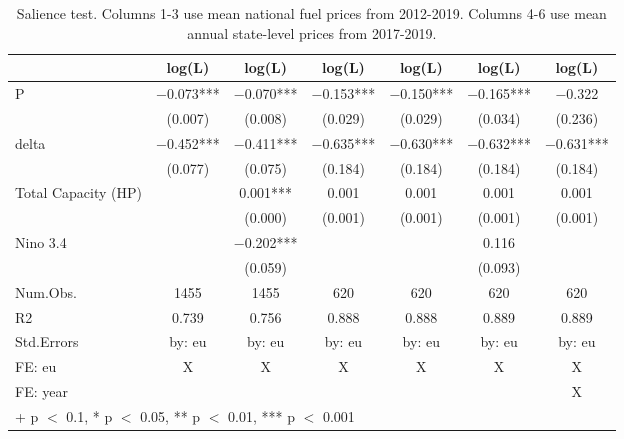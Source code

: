 \begin{table}

\caption{\label{tab:}Salience test.
             Columns 1-3 use mean national fuel prices from 2012-2019.
             Columns 4-6 use mean annual state-level prices from 2017-2019.}
\centering
\begin{tabular}[t]{lcccccc}
\toprule
  & log(L) & log(L)  & log(L)   & log(L)    & log(L)     & log(L)     \\
\midrule
P & \num{-0.073}*** & \num{-0.070}*** & \num{-0.153}*** & \num{-0.150}*** & \num{-0.165}*** & \num{-0.322}\\
 & (\num{0.007}) & (\num{0.008}) & (\num{0.029}) & (\num{0.029}) & (\num{0.034}) & (\num{0.236})\\
delta & \num{-0.452}*** & \num{-0.411}*** & \num{-0.635}*** & \num{-0.630}*** & \num{-0.632}*** & \num{-0.631}***\\
 & (\num{0.077}) & (\num{0.075}) & (\num{0.184}) & (\num{0.184}) & (\num{0.184}) & (\num{0.184})\\
Total Capacity (HP) &  & \num{0.001}*** & \num{0.001} & \num{0.001} & \num{0.001} & \num{0.001}\\
 &  & (\num{0.000}) & (\num{0.001}) & (\num{0.001}) & (\num{0.001}) & (\num{0.001})\\
Nino 3.4 &  & \num{-0.202}*** &  &  & \num{0.116} & \\
 &  & (\num{0.059}) &  &  & (\num{0.093}) & \\
\midrule
Num.Obs. & \num{1455} & \num{1455} & \num{620} & \num{620} & \num{620} & \num{620}\\
R2 & \num{0.739} & \num{0.756} & \num{0.888} & \num{0.888} & \num{0.889} & \num{0.889}\\
Std.Errors & by: eu & by: eu & by: eu & by: eu & by: eu & by: eu\\
FE: eu & X & X & X & X & X & X\\
FE: year &  &  &  &  &  & X\\
\bottomrule
\multicolumn{7}{l}{\rule{0pt}{1em}+ p $<$ 0.1, * p $<$ 0.05, ** p $<$ 0.01, *** p $<$ 0.001}\\
\end{tabular}
\end{table}
